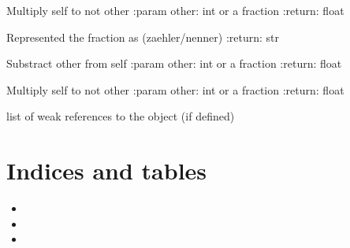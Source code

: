 \documentclass[letterpaper,10pt,english]{sphinxmanual}
\begin{document}
\begin{fulllineitems}
\begin{fulllineitems}
\end{fulllineitems}


\begin{fulllineitems}
\label{bruch:bruch.Bruch.__rtruediv__}
Multiply self to not other
:param other: int or a fraction
:return: float

\end{fulllineitems}


\begin{fulllineitems}
\label{bruch:bruch.Bruch.__str__}
Represented the fraction as (zaehler/nenner)
:return: str

\end{fulllineitems}


\begin{fulllineitems}
\label{bruch:bruch.Bruch.__sub__}
Substract other from self
:param other: int or a fraction
:return: float

\end{fulllineitems}


\begin{fulllineitems}
\label{bruch:bruch.Bruch.__truediv__}
Multiply self to not other
:param other: int or a fraction
:return: float

\end{fulllineitems}


\begin{fulllineitems}
\label{bruch:bruch.Bruch.__weakref__}
list of weak references to the object (if defined)

\end{fulllineitems}


\end{fulllineitems}



\chapter{Indices and tables}
\label{index:indices-and-tables}\begin{itemize}
\item {} 

\item {} 

\item {} 

\end{itemize}
\end{document}
